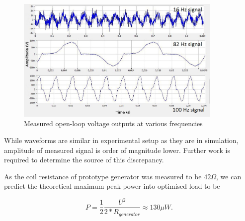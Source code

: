 \begin{figure}[h]
\begin{center}
  \includegraphics[height=6cm]{images/own_measurement/lg_proto.jpg}
  \end{center}
  \caption{\label{fiq:lg_proto_results} Measured open-loop voltage outputs at various frequencies}
\end{figure}

While waveforms are similar in experimental setup as they are in simulation, amplitude of measured signal is order of magnitude lower. Further work is required to determine the source of this discrepancy. 

As the coil resistance of prototype generator was measured to be $42 \Omega$, we can predict the theoretical maximum peak power into optimised load to be 

\begin{equation}
  P = \frac{1}{2}\frac{U^2}{2*R_{generator}} \approx 130 \mu W.
\end{equation}
